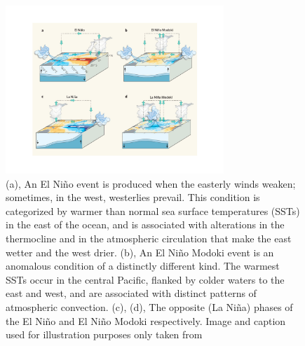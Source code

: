 \documentclass[]{article}
\begin{document}



\begin{figure}[htbp]
	\centering
		\includegraphics[height=2.5in]{figures/nino_cartoon.pdf}
	\caption{(a), An El Ni\~no event is produced when the easterly winds weaken; sometimes, in the west, westerlies prevail. This condition is categorized by warmer than normal sea surface temperatures (SSTs) in the east of the ocean, and is associated with alterations in the thermocline and in the atmospheric circulation that make the east wetter and the west drier. (b), An El Ni\~no Modoki event is an anomalous condition of a distinctly different kind. The warmest SSTs occur in the central Pacific, flanked by colder waters to the east and west, and are associated with distinct patterns of atmospheric convection. (c), (d), The opposite (La Ni\~na) phases of the El Niño and El Ni\~no Modoki respectively. Image and caption used for illustration purposes only taken from \cite{ashok2009}}
	\label{fig:enso_cartoon}
\end{figure}
\end{document}
